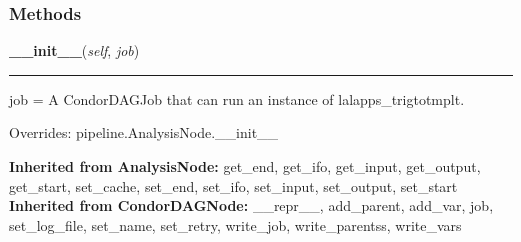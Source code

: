   \subsubsection{Methods}

    \label{inspiral:TrigToTmpltNode:__init__}
    \vspace{0.5ex}

    \noindent\begin{boxedminipage}{\textwidth}

    \raggedright \textbf{\_\_init\_\_}(\textit{self}, \textit{job})

    \vspace{-1.5ex}

    \rule{\textwidth}{0.5\fboxrule}
    job = A CondorDAGJob that can run an instance of 
    lalapps\_trigtotmplt.

    \vspace{1ex}

      Overrides: pipeline.AnalysisNode.\_\_init\_\_

    \end{boxedminipage}

  \textbf{Inherited from AnalysisNode:}
    get\_end,
    get\_ifo,
    get\_input,
    get\_output,
    get\_start,
    set\_cache,
    set\_end,
    set\_ifo,
    set\_input,
    set\_output,
    set\_start
    \\
  \textbf{Inherited from CondorDAGNode:}
    \_\_repr\_\_,
    add\_parent,
    add\_var,
    job,
    set\_log\_file,
    set\_name,
    set\_retry,
    write\_job,
    write\_parentss,
    write\_vars
